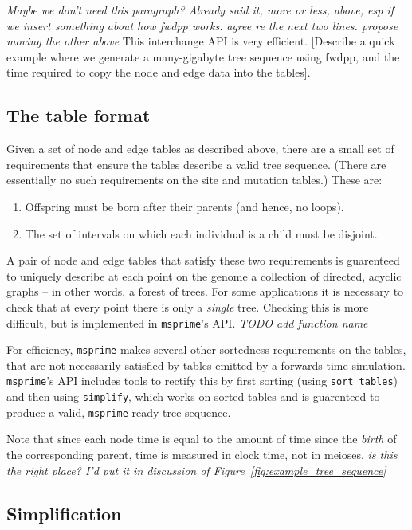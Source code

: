 \documentclass{article}
\newcommand{\msprime}{\texttt{msprime}}
\newcommand{\plr}[1]{{\em \color{blue} #1}}
\newcommand{\jda}[1]{{\em \color{cyan} #1}}
\begin{document}
\plr{Maybe we don't need this paragraph? Already said it, more or less, above, esp if we insert something about how fwdpp works.}
\jda{agree re the next two lines. propose moving the other above}
This interchange API is very efficient. [Describe a quick example where we generate
a many-gigabyte tree sequence using fwdpp, and the time required
to copy the node and edge data into the tables].

\subsection*{The table format}

Given a set of node and edge tables as described above,
there are a small set of requirements that ensure the tables
describe a valid tree sequence.
(There are essentially no such requirements on the site and mutation tables.)
These are:
\begin{enumerate}
    \item Offspring must be born after their parents (and hence, no loops).
    \item The set of intervals on which each individual is a child must be disjoint.
\end{enumerate}
A pair of node and edge tables that satisfy these two requirements
is guarenteed to uniquely describe at each point on the genome
a collection of directed, acyclic graphs -- in other words, a forest of trees.
For some applications it is necessary to check that at every point
there is only a \emph{single} tree.
Checking this is more difficult, but is implemented in \msprime{}'s API.
\jda{TODO add function name}

For efficiency, \msprime{} makes several other sortedness requirements on the tables,
that are not necessarily satisfied by tables emitted by a forwards-time simulation.
\msprime{}'s API includes tools to rectify this by first sorting (using \texttt{sort\_tables})
and then using \texttt{simplify}, which works on sorted tables
and is guarenteed to produce a valid, \msprime{}-ready tree sequence.

Note that since each node time is equal to the amount of time since the \emph{birth} of the
corresponding parent, time is measured in clock time, not in meioses.
\jda{is this the right place? I'd put it in discussion of Figure~\ref{fig:example_tree_sequence}}


\subsection*{Simplification}
\end{document}
